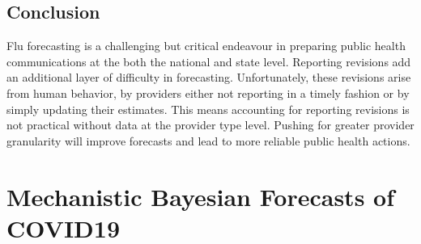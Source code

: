 \documentclass{umassthesis}          %
\begin{document}
\section{Conclusion}


Flu forecasting is a challenging but critical endeavour in preparing public health communications at the both the national and state level. Reporting revisions add an additional layer of difficulty in forecasting. Unfortunately, these revisions arise from human behavior, by providers either not reporting in a timely fashion or by simply updating their estimates. This means accounting for reporting revisions is not practical without data at the provider type level. Pushing for greater provider granularity will improve forecasts and lead to more reliable public health actions. 


\chapter{Mechanistic Bayesian Forecasts of COVID19}
\end{document}
